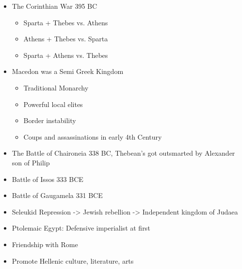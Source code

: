 \documentclass[12pt,a4paper]{report}
\begin{document}
\begin{itemize}
\item The Corinthian War 395 BC
\begin{itemize}
\item Sparta + Thebes vs. Athens
\item Athens + Thebes vs. Sparta
\item Sparta + Athens vs. Thebes
\end{itemize}
\item Macedon was a Semi Greek Kingdom
\begin{itemize}
\item Traditional Monarchy
\item Powerful local elites
\item Border instability
\item Coups and assassinations in early 4th Century
\end{itemize}
\item The Battle of Chaironeia 338 BC, Thebean's got outsmarted by Alexander son of Philip
\item Battle of Issos 333 BCE
\item Battle of Gaugamela 331 BCE
\item Seleukid Repression -> Jewish rebellion -> Independent kingdom of Judaea
\item Ptolemaic Egypt: Defensive imperialist at first
\item Friendship with Rome
\item Promote Hellenic culture, literature, arts
\end{itemize}
\end{document}
